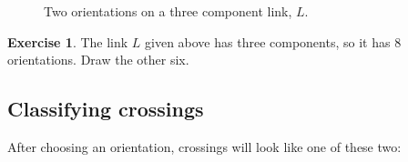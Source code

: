 \documentclass[12pt,letterpaper]{article}
\theoremstyle{definition}
\newtheorem{exercise}[question]{Exercise}
\begin{document}
\begin{figure}[h]
\begin{subfigure}{.3\textwidth}
    \end{subfigure}
    \caption{Two orientations on a three component link, $L$.}
\end{figure}

\begin{exercise}
The link $L$ given above has three components, so it has 8 orientations.
Draw the other six.
\end{exercise}

\clearpage

\subsection*{Classifying crossings}

After choosing an orientation, crossings will look like one of these two:
\end{document}
